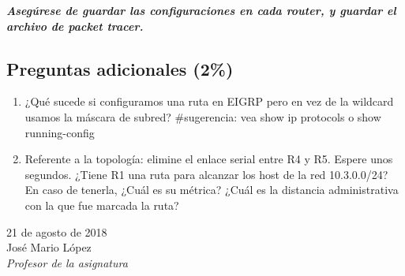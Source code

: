 \documentclass[12pt]{article}
\begin{document}
\textit{\textbf{Asegúrese de guardar las configuraciones en cada router, y guardar el archivo de packet tracer.}}

\subsection{Preguntas adicionales (2\%)}
\begin{enumerate}
\item ¿Qué sucede si configuramos una ruta en EIGRP pero en vez de la wildcard usamos la máscara de subred? \#sugerencia: vea show ip protocols o show running-config
\item Referente a la topología: elimine el enlace serial entre R4 y R5. Espere unos segundos. ¿Tiene R1 una ruta para alcanzar los host de la red 10.3.0.0/24?
En caso de tenerla, ¿Cuál es su métrica? ¿Cuál es la distancia administrativa con la que fue marcada la ruta?
\end{enumerate}

\vfill
21 de agosto de 2018\\
José Mario López\\
\textit{Profesor de la asignatura}
\end{document}
